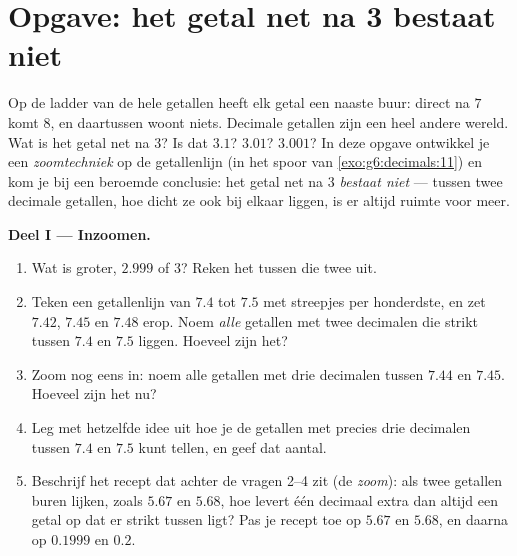 \section{Opgave: het getal net na 3 bestaat niet}

\begin{problem}
\label{pb:g6:decimals:1}
Op de ladder van de hele getallen heeft elk getal een naaste buur: direct na
$7$ komt $8$, en daartussen woont niets. Decimale getallen zijn een heel
andere wereld. Wat is het getal net na $3$? Is dat $3.1$? $3.01$? $3.001$? In
deze opgave ontwikkel je een \emph{zoomtechniek} op de getallenlijn (in het
spoor van \cref{exo:g6:decimals:11}) en kom je bij een beroemde conclusie: het
getal net na $3$ \emph{bestaat niet} --- tussen twee decimale getallen, hoe
dicht ze ook bij elkaar liggen, is er altijd ruimte voor meer.

\medskip
\noindent\textbf{Deel I --- Inzoomen.}
\begin{enumerate}
  \item Wat is groter, $2.999$ of $3$? Reken het  tussen die twee
        uit.
  \item Teken een getallenlijn van $7.4$ tot $7.5$ met streepjes per
        honderdste, en zet $7.42$, $7.45$ en $7.48$ erop. Noem \emph{alle}
        getallen met twee decimalen die strikt tussen $7.4$ en $7.5$ liggen.
        Hoeveel zijn het?
  \item Zoom nog eens in: noem alle getallen met drie decimalen tussen $7.44$
        en $7.45$. Hoeveel zijn het nu?
  \item Leg met hetzelfde idee uit hoe je de getallen met precies drie
        decimalen tussen $7.4$ en $7.5$ kunt tellen, en geef dat aantal.
  \item Beschrijf het recept dat achter de vragen 2--4 zit (de \emph{zoom}):
        als twee getallen buren lijken, zoals $5.67$ en $5.68$, hoe levert
        één decimaal extra dan altijd een getal op dat er strikt tussen
        ligt? Pas je recept toe op $5.67$ en $5.68$, en daarna op $0.1999$ en
        $0.2$.
\end{enumerate}


\end{problem}
